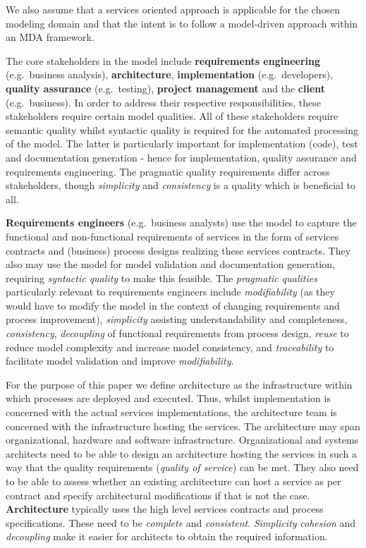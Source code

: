 We also assume that a services oriented approach is applicable for the chosen modeling domain and that the intent is to follow a model-driven approach within an MDA framework.

The core stakeholders in the model include {\bf requirements engineering} (e.g.\ business analysis), {\bf architecture}, {\bf implementation} (e.g.\ developers), {\bf quality assurance} (e.g.\ testing), {\bf project management} and the {\bf client} (e.g.\ business). In order to address their respective responsibilities, these stakeholders require certain model qualities. All of these stakeholders require semantic quality whilst syntactic quality is required for the automated processing of the model. The latter is particularly important for implementation (code), test and documentation generation - hence for implementation, quality assurance and requirements engineering. The pragmatic quality requirements differ across stakeholders, though \emph{simplicity} and \emph{consistency} is a quality which is beneficial to all.

{\bf Requirements engineers} (e.g.\ business analysts) use the model to capture the functional and non-functional requirements of  services in the form of services contracts and (business) process designs realizing these services contracts. They also may use the model for model validation and documentation generation, requiring \emph{syntactic quality} to make this feasible.  The \emph{pragmatic qualities} particularly relevant to requirements engineers include \emph{modifiability} (as they would have to modify the model in the context of changing requirements and process improvement), \emph{simplicity} assisting understandability and completeness, \emph{consistency}, \emph{decoupling} of functional requirements from process design, \emph{reuse} to reduce model complexity and increase model consistency, and \emph{traceability} to facilitate model validation and improve \emph{modifiability}. 

For the purpose of this paper we define architecture as the infrastructure within which processes are deployed and executed. Thus, whilst implementation is concerned with the actual services implementations, the architecture team is concerned with the infrastructure hosting the services. The architecture may span organizational, hardware and software infrastructure. Organizational and systems architects need to be able to design an architecture hosting the services in such a way that the quality requirements (\emph{quality of service}) can be met. They also need to be able to assess whether an existing architecture can host a service as per contract and specify architectural modifications if that is not the case. {\bf Architecture} typically uses the high level services contracts and process specifications. These need to be \emph{complete} and \emph{consistent}. \emph{Simplicity} \emph{cohesion} and \emph{decoupling} make it easier for architects to obtain the required information.

